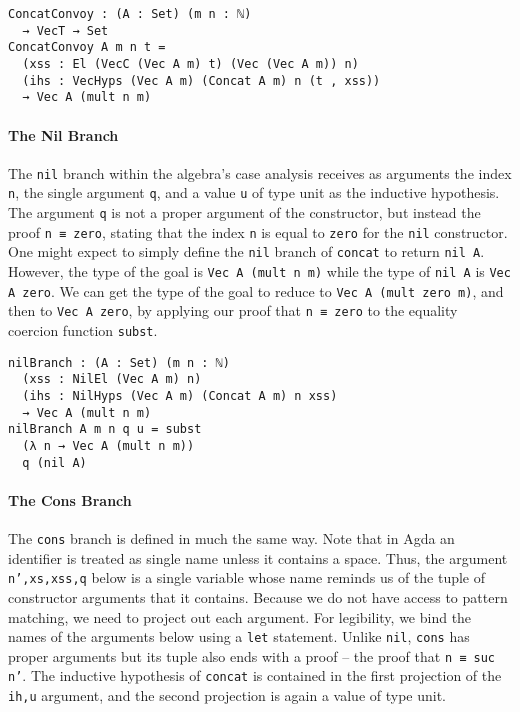 \documentclass[preprint,nonatbib]{sigplanconf}
\begin{document}
\begin{verbatim}
ConcatConvoy : (A : Set) (m n : ℕ)
  → VecT → Set
ConcatConvoy A m n t =
  (xss : El (VecC (Vec A m) t) (Vec (Vec A m)) n)
  (ihs : VecHyps (Vec A m) (Concat A m) n (t , xss))
  → Vec A (mult n m)
\end{verbatim}

\paragraph{The Nil Branch}

The {\tt nil} branch within the algebra's case analysis receives as
arguments the index {\tt n}, the single argument {\tt q}, and a value
{\tt u} of type unit as the inductive hypothesis. The argument
{\tt q} is not a proper argument of the constructor, but instead the
proof {\tt n ≡ zero}, stating that the index {\tt n} is equal to
{\tt zero} for the {\tt nil} constructor. One might expect to simply
define the {\tt nil} branch of {\tt concat} to return {\tt nil A}.
However, the type of the goal is {\tt Vec A (mult n m)} while the type
of {\tt nil A} is {\tt Vec A zero}. We can get the type of the goal to
reduce to {\tt Vec A (mult zero m)}, and then to {\tt Vec A zero}, by
applying our proof that {\tt n ≡ zero} to the equality coercion
function {\tt subst}.

\begin{verbatim}
nilBranch : (A : Set) (m n : ℕ)
  (xss : NilEl (Vec A m) n)
  (ihs : NilHyps (Vec A m) (Concat A m) n xss)
  → Vec A (mult n m)
nilBranch A m n q u = subst
  (λ n → Vec A (mult n m))
  q (nil A)
\end{verbatim}

\paragraph{The Cons Branch}

The {\tt cons} branch is defined in much the same way. Note
that in {\sc Agda} an identifier is treated as single name unless it
contains a space. Thus, the argument {\tt n',xs,xss,q} below is a
single variable whose name reminds us of the tuple of constructor
arguments that it contains. Because we do not have access to pattern
matching, we need to project out each argument. For legibility, we
bind the names of the arguments below using a {\tt let} statement.
Unlike {\tt nil}, {\tt cons} has proper arguments but its tuple also
ends with a proof -- the proof that {\tt n ≡ suc n'}. The inductive
hypothesis of {\tt concat} is contained in the first projection of the
{\tt ih,u} argument, and the second projection is again a value of
type unit.
\end{document}
